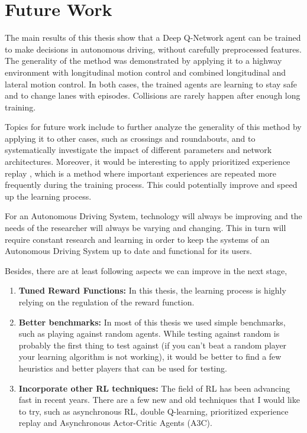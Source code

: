 \chapter{Future Work}

The main results of this thesis show that a Deep Q-Network agent can be trained to make decisions in autonomous driving, without carefully preprocessed features. The generality of the method was demonstrated by applying it to a highway environment with longitudinal motion control and combined longitudinal and lateral motion control. In both cases, the trained agents are learning to stay safe and to change lanes with episodes. Collisions are rarely happen after enough long training. 

Topics for future work include to further analyze the generality of this method by applying it to other cases, such as crossings and roundabouts, and to systematically investigate the impact of different parameters and network architectures. Moreover, it would be interesting to apply prioritized experience replay \cite{Replay2015}, which is a method where important experiences are repeated more frequently during the training process. This could potentially improve and speed up the learning process.

For an Autonomous Driving System, technology will always be improving and the needs of the researcher will always be varying and changing. This in turn will require constant research and learning in order to keep the systems of an Autonomous Driving System up to date and functional for its users.

Besides, there are at least following aspects we can improve in the next stage,

\begin{enumerate}

    \item \textbf{Tuned Reward Functions:} In this thesis, the learning process is highly relying on the regulation of the reward function.
    
    \item \textbf{Better benchmarks:} In most of this thesis we used simple benchmarks, such as playing against random agents. While testing against random is probably the first thing to test against (if you can't beat a random player your learning algorithm is not working), it would be better to find a few heuristics and better players that can be used for testing.

    \item \textbf{Incorporate other RL techniques:} The field of RL has been advancing fast in recent years. There are a few new and old techniques that I would like to try, such as asynchronous RL, double Q-learning, prioritized experience replay and Asynchronous Actor-Critic Agents (A3C).

\end{enumerate}
